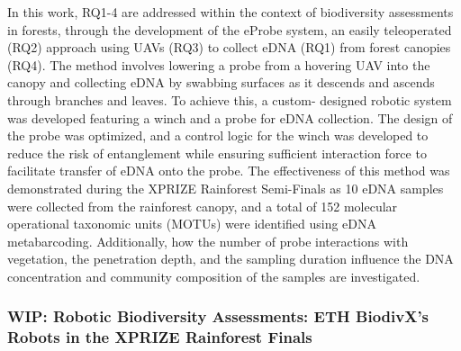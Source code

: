 In this work, RQ1-4 are addressed within the context of biodiversity assessments in forests, through the development of the eProbe system, an easily teleoperated (RQ2) approach using UAVs (RQ3) to collect eDNA (RQ1) from forest canopies (RQ4).  The method involves lowering a probe from a hovering UAV into the canopy and collecting eDNA by swabbing surfaces as it descends and ascends through branches and leaves. To achieve this, a custom- designed robotic system was developed featuring a winch and a probe for eDNA collection. The design of the probe was optimized, and a control logic for the winch was developed to reduce the risk of entanglement while ensuring sufficient interaction force to facilitate transfer of eDNA onto the probe. The effectiveness of this method was demonstrated during the XPRIZE Rainforest Semi-Finals as 10 eDNA samples were collected from the rainforest canopy, and a total of 152 molecular operational taxonomic units (MOTUs) were identified using eDNA metabarcoding. Additionally, how the number of probe interactions with vegetation, the penetration depth, and the sampling duration influence the DNA concentration and community composition of the samples are investigated.

\subsubsection{WIP: Robotic Biodiversity Assessments: ETH BiodivX's Robots in the XPRIZE Rainforest Finals}

